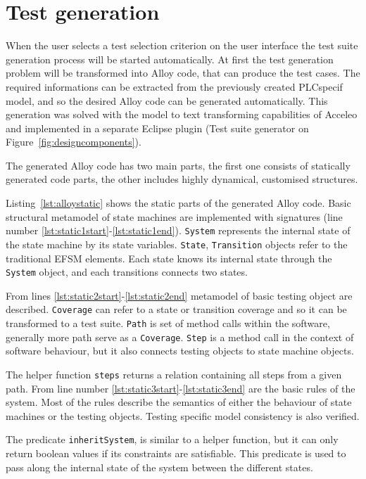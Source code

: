 \section{Test generation}
\label{sec:testgenerationimplementation}
	
When the user selects a test selection criterion on the user interface the test suite generation process will be started automatically. At first the test generation problem will be transformed into Alloy code, that can produce the test cases. The required informations can be extracted from the previously created PLCspecif model, and so the desired Alloy code can be generated automatically. This generation was solved with the model to text transforming capabilities of Acceleo and implemented in a separate Eclipse plugin (Test suite generator on Figure~\ref{fig:designcomponents}).
	
The generated Alloy code has two main parts, the first one consists of statically generated code parts, the other includes highly dynamical, customised structures.
	
Listing~\ref{lst:alloystatic} shows the static parts of the generated Alloy code. Basic structural metamodel of state machines are implemented with signatures (line number  \ref{lst:static1start}-\ref{lst:static1end}). \texttt{System} represents the internal state of the state machine by its state variables. \texttt{State}, \texttt{Transition} objects refer to the traditional EFSM elements. Each state knows its internal state through the \texttt{System} object, and each transitions connects two states.
	
From lines \ref{lst:static2start}-\ref{lst:static2end} metamodel of basic testing object are described. \texttt{Coverage} can refer to a state or transition coverage and so it can be transformed to a test suite. \texttt{Path} is set of method calls within the software, generally more path serve as a \texttt{Coverage}. \texttt{Step} is a method call in the context of software behaviour, but it also connects testing objects to state machine objects.
	
The helper function \texttt{steps} returns a relation containing all steps from a given path. From line number \ref{lst:static3start}-\ref{lst:static3end} are the basic rules of the system. Most of the rules describe the semantics of either the behaviour of state machines or the testing objects. Testing specific model consistency is also verified.

The predicate \texttt{inheritSystem}, is similar to a helper function, but it can only return boolean values if its constraints are satisfiable. This predicate is used to pass along the internal state of the system between the different states.
	
